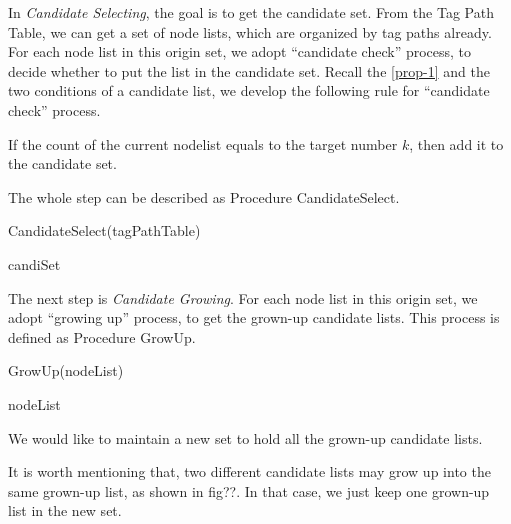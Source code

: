 In {\em Candidate Selecting}, 
the goal is to get the candidate set.
From the Tag Path Table, we can get a set of node lists, 
which are organized by tag paths already.
For each node list in this origin set, we adopt ``candidate check'' process,  
to decide whether to put the list in the candidate set.
Recall the \ref{prop-1} and the two conditions of a candidate list, 
we develop the following rule for ``candidate check'' process.

\begin{newrule}\label{rule-1}
If the count of the current nodelist equals to the target number $k$, 
then add it to the candidate set.
\end{newrule}

The whole step can be described as Procedure CandidateSelect.

\begin{algorithm}[htbp]
\caption{CandidateSelect(tagPathTable)}
\begin{algorithmic}[1]\label{algo:candiselect}
		\ENDIF
	\ENDFOR		
	\RETURN candiSet
\end{algorithmic}
\end{algorithm}



The next step is {\em Candidate Growing}.
For each node list in this origin set, 
we adopt ``growing up'' process, 
to get the grown-up candidate lists.
This process is defined as Procedure GrowUp.

\begin{algorithm}[htbp]
\caption{GrowUp(nodeList)}
\begin{algorithmic}[1]\label{algo:growup}
			\ENDIF	
		\ENDFOR
		\ELSE
		\ENDIF
	\ENDWHILE	
	\RETURN nodeList
\end{algorithmic}
\end{algorithm}


We would like to maintain a new set to hold all the grown-up candidate lists.

It is worth mentioning that, 
two different candidate lists may grow up into the same grown-up list,
as shown in fig??.
In that case, we just keep one grown-up list in the new set.


